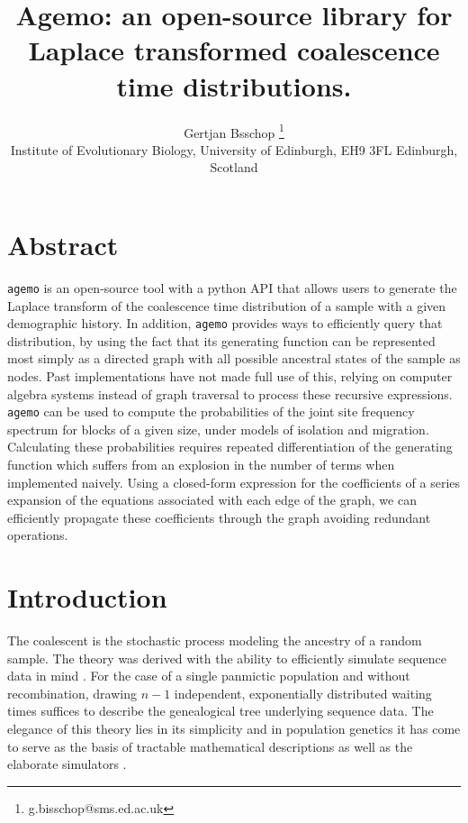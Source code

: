\documentclass[10pt, a4]{article}
\title{Agemo: an open-source library for Laplace transformed coalescence time distributions.}
\author{Gertjan Bsschop \thanks{g.bisschop@sms.ed.ac.uk} \\ Institute of Evolutionary Biology, University of Edinburgh, EH9 3FL Edinburgh, Scotland}
\date{}
\begin{document}
\maketitle

\section*{Abstract}
\texttt{agemo} is an open-source tool with a python API that allows users to generate the Laplace transform of the coalescence time distribution of a sample with a given demographic history. In addition, \texttt{agemo} provides ways to efficiently query that distribution, by using the fact that its generating function can be represented most simply as a directed graph with all possible ancestral states of the sample as nodes. Past implementations have not made full use of this, relying on computer algebra systems instead of graph traversal to process these recursive expressions.
\texttt{agemo} can be used to compute the probabilities of the joint site frequency spectrum for blocks of a given size, under models of isolation and migration. Calculating these probabilities requires repeated differentiation of the generating function which suffers from an explosion in the number of terms when implemented naively. Using a closed-form expression for the coefficients of a series expansion of the equations associated with each edge of the graph, we can efficiently propagate these coefficients through the graph avoiding redundant operations.

\vspace{1cm} 
\linenumbers

\section{Introduction}

The coalescent \citep{Kingman1982, Hudson1983, Tajima1983} is the stochastic process modeling the ancestry of a random sample. The theory was derived with the ability to efficiently simulate sequence data in mind \citep{Hudson1983}. For the case of a single panmictic population and without recombination, drawing $n-1$ independent, exponentially distributed waiting times suffices to describe the genealogical tree underlying sequence data. The elegance of this theory lies in its simplicity and in population genetics it has come to serve as the basis of tractable mathematical descriptions as well as the elaborate simulators \citep{Baumdicker2021}.
\end{document}
